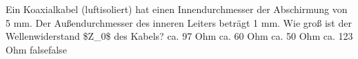     {Ein Koaxialkabel (luftisoliert) hat einen Innendurchmesser der Abschirmung von 5 mm. Der Außendurchmesser des inneren Leiters beträgt 1 mm. Wie groß ist der Wellenwiderstand \$Z\_0\$ des Kabels?}
    {ca. 97 Ohm}
    {ca. 60 Ohm}
    {ca. 50 Ohm}
    {ca. 123 Ohm}
    {false}{false}